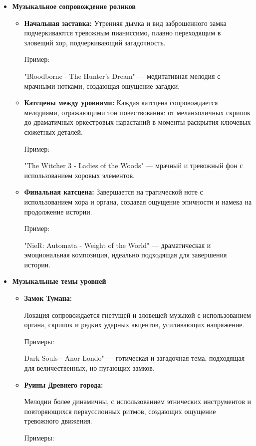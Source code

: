 \documentclass{article}
\begin{document}
\begin{itemize}
\item \textbf{Музыкальное сопровождение роликов}\par
\begin{itemize}
\item \textbf{Начальная заставка:}
 Утренняя дымка и вид заброшенного замка подчеркиваются тревожным пианиссимо, плавно переходящим в зловещий хор, подчеркивающий загадочность.\par
Пример: \par
"Bloodborne - The Hunter's Dream" — медитативная мелодия с мрачными нотками, создающая ощущение загадки.\par
\item \textbf{Катсцены между уровнями:} Каждая катсцена сопровождается мелодиями, отражающими тон повествования: от меланхоличных скрипок до драматичных оркестровых нарастаний в моменты раскрытия ключевых сюжетных деталей.\par
Пример: \par
"The Witcher 3 - Ladies of the Woods" — мрачный и тревожный фон с использованием хоровых элементов.
\item \textbf{Финальная катсцена:} Завершается на трагической ноте с использованием хора и органа, создавая ощущение эпичности и намека на продолжение истории.\par
Пример:\par
"NieR: Automata - Weight of the World" — драматическая и эмоциональная композиция, идеально подходящая для завершения истории.
\end{itemize}
\item \textbf{Музыкальные темы уровней}\par
\begin{itemize}
\item \textbf{Замок Тумана:}\par
 Локация сопровождается гнетущей и зловещей музыкой с использованием органа, скрипок и редких ударных акцентов, усиливающих напряжение.\par
Примеры: \par
Dark Souls - Anor Londo" — готическая и загадочная тема, подходящая для величественных, но пугающих замков.\par
\item \textbf{Руины Древнего города:}\par
 Мелодии более динамичны, с использованием этнических инструментов и повторяющихся перкуссионных ритмов, создающих ощущение тревожного движения.\par
Примеры: \par

\end{itemize}
\end{itemize}
\end{document}
